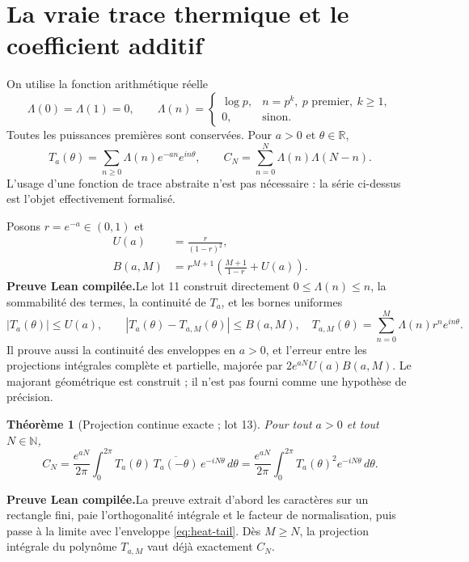 \documentclass[11pt,a4paper]{article}
\newtheorem{theorem}{Théorème}[section]
\theoremstyle{remark}
\newcommand{\Lam}{\Lambda}
\newcommand{\R}{\mathbb R}
\newcommand{\N}{\mathbb N}
\newcommand{\paid}{\textbf{Preuve Lean compilée.}\space}
\begin{document}
\clearpage
\section{La vraie trace thermique et le coefficient additif}\label{sec:heat}
On utilise la fonction arithmétique réelle
\[
\Lam(0)=\Lam(1)=0,\qquad
\Lam(n)=\begin{cases}\log p,&n=p^k,\ p\text{ premier},\ k\ge1,\\0,&\text{sinon}.
\end{cases}
\]
Toutes les puissances premières sont conservées. Pour $a>0$ et $\theta\in\R$,
\begin{equation}\label{eq:heat}
T_a(\theta)=\sum_{n\ge0}\Lam(n)e^{-an}e^{in\theta},\qquad
C_N=\sum_{n=0}^{N}\Lam(n)\Lam(N-n).
\end{equation}
L'usage d'une fonction de trace abstraite n'est pas nécessaire : la série
ci-dessus est l'objet effectivement formalisé.

Posons $r=e^{-a}\in(0,1)$ et
\begin{align}
U(a)&=\frac{r}{(1-r)^2},\label{eq:U}\\
B(a,M)&=r^{M+1}\left(\frac{M+1}{1-r}+U(a)\right).
\label{eq:heat-tail}
\end{align}
\paid Le lot 11 construit directement $0\le\Lam(n)\le n$, la
sommabilité des termes, la continuité de $T_a$, et les bornes uniformes
\[
|T_a(\theta)|\le U(a),\qquad
|T_a(\theta)-T_{a,M}(\theta)|\le B(a,M),
\quad T_{a,M}(\theta)=\sum_{n=0}^{M}\Lam(n)r^ne^{in\theta}.
\]
Il prouve aussi la continuité des enveloppes en $a>0$, et l'erreur entre
les projections intégrales complète et partielle, majorée par
$2e^{aN}U(a)B(a,M)$. Le majorant géométrique est construit ; il n'est pas
fourni comme une hypothèse de précision.

\begin{theorem}[Projection continue exacte ; lot 13]\label{thm:circle}
Pour tout $a>0$ et tout $N\in\N$,
\begin{equation}\label{eq:circle}
C_N=\frac{e^{aN}}{2\pi}\int_0^{2\pi}
T_a(\theta)\,\overline{T_a(-\theta)}\,e^{-iN\theta}\,d\theta
=\frac{e^{aN}}{2\pi}\int_0^{2\pi}T_a(\theta)^2e^{-iN\theta}\,d\theta.
\end{equation}
\end{theorem}
\paid La preuve extrait d'abord les caractères sur un rectangle fini,
paie l'orthogonalité intégrale et le facteur de normalisation, puis passe à
la limite avec l'enveloppe \eqref{eq:heat-tail}. Dès $M\ge N$, la projection
intégrale du polynôme $T_{a,M}$ vaut déjà exactement $C_N$.
\end{document}
